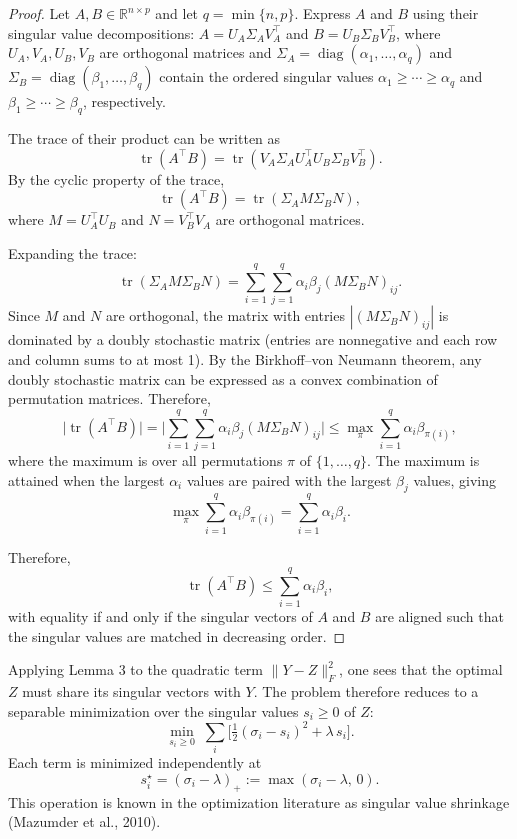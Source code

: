 \documentclass[11pt]{article}
\theoremstyle{spaced}
\begin{document}
\begin{proof}
Let \(A, B \in \mathbb{R}^{n \times p}\) and let \(q = \min\{n,p\}\). Express \(A\) and \(B\) using their singular value decompositions:
\(A = U_A \Sigma_A V_A^\top\) and \(B = U_B \Sigma_B V_B^\top\), where \(U_A, V_A, U_B, V_B\) are orthogonal matrices and 
\(\Sigma_A = \operatorname{diag}(\alpha_1, \ldots, \alpha_q)\) and 
\(\Sigma_B = \operatorname{diag}(\beta_1, \ldots, \beta_q)\) 
contain the ordered singular values \(\alpha_1 \ge \cdots \ge \alpha_q\) and \(\beta_1 \ge \cdots \ge \beta_q\), respectively.

The trace of their product can be written as
\[
\operatorname{tr}(A^\top B)
= \operatorname{tr}(V_A \Sigma_A U_A^\top U_B \Sigma_B V_B^\top).
\]
By the cyclic property of the trace,
\[
\operatorname{tr}(A^\top B)
= \operatorname{tr}(\Sigma_A M \Sigma_B N),
\]
where \(M = U_A^\top U_B\) and \(N = V_B^\top V_A\) are orthogonal matrices.

Expanding the trace:
\[
\operatorname{tr}(\Sigma_A M \Sigma_B N)
= \sum_{i=1}^q \sum_{j=1}^q \alpha_i \beta_j (M \Sigma_B N)_{ij}.
\]
Since \(M\) and \(N\) are orthogonal, the matrix with entries \(|(M \Sigma_B N)_{ij}|\) is dominated by a doubly stochastic matrix (entries are nonnegative and each row and column sums to at most 1). By the Birkhoff--von Neumann theorem, any doubly stochastic matrix can be expressed as a convex combination of permutation matrices. Therefore,
\[
\big|\operatorname{tr}(A^\top B)\big|
=\bigg|\sum_{i=1}^q\sum_{j=1}^q \alpha_i \beta_j (M \Sigma_B N)_{ij}\bigg|
\le \max_{\pi} \sum_{i=1}^q \alpha_i \beta_{\pi(i)},
\]
where the maximum is over all permutations \(\pi\) of \(\{1,\ldots,q\}\). The maximum is attained when the largest \(\alpha_i\) values are paired with the largest \(\beta_j\) values, giving
\[
\max_{\pi} \sum_{i=1}^q \alpha_i \beta_{\pi(i)} = \sum_{i=1}^q \alpha_i \beta_i.
\]

Therefore,
\[
\operatorname{tr}(A^\top B) \le \sum_{i=1}^q \alpha_i \beta_i,
\]
with equality if and only if the singular vectors of \(A\) and \(B\) are aligned such that the singular values are matched in decreasing order.
\end{proof}

Applying Lemma 3 to the quadratic term \(\|Y-Z\|_F^2\), one sees that the optimal \(Z\) must share its singular vectors with \(Y\).  
The problem therefore reduces to a separable minimization over the singular values \(s_i \ge 0\) of \(Z\):
\[
\min_{s_i \ge 0} \;
\sum_i \Big[ \tfrac{1}{2} (\sigma_i - s_i)^2 + \lambda\, s_i \Big].
\]
Each term is minimized independently at
\[
s_i^\star = (\sigma_i - \lambda)_+ := \max(\sigma_i - \lambda,\, 0).
\]
This operation is known in the optimization literature as singular value shrinkage (Mazumder et al., 2010).
\end{document}
